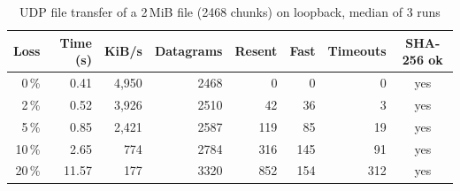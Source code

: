 \begin{table}[H]\centering\small
\caption{UDP file transfer of a 2\,MiB file (2468 chunks) on loopback, median of 3 runs}\label{tab:bench}
\begin{tabular}{@{}rrrrrrrc@{}}
\toprule
\textbf{Loss} & \textbf{Time (s)} & \textbf{KiB/s} & \textbf{Datagrams} & \textbf{Resent} & \textbf{Fast} & \textbf{Timeouts} & \textbf{SHA-256 ok} \\
\midrule
0\,\% & 0.41 & 4,950 & 2468 & 0 & 0 & 0 & yes \\
2\,\% & 0.52 & 3,926 & 2510 & 42 & 36 & 3 & yes \\
5\,\% & 0.85 & 2,421 & 2587 & 119 & 85 & 19 & yes \\
10\,\% & 2.65 & 774 & 2784 & 316 & 145 & 91 & yes \\
20\,\% & 11.57 & 177 & 3320 & 852 & 154 & 312 & yes \\
\bottomrule
\end{tabular}
\end{table}
